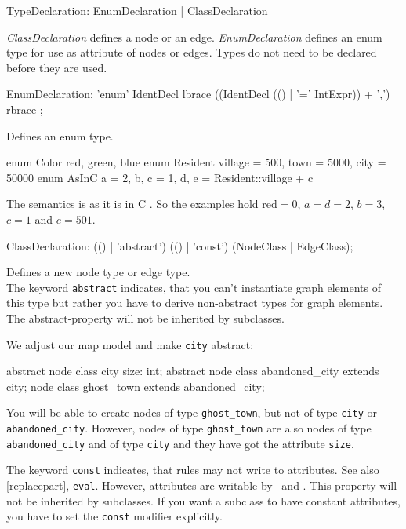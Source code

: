 \begin{rail}
  TypeDeclaration: EnumDeclaration | ClassDeclaration
\end{rail}
\emph{ClassDeclaration} defines a node or an edge. \emph{EnumDeclaration} defines an enum type for use as attribute of nodes or edges. Types do not need to be declared before they are used.

\begin{rail}
  EnumDeclaration: 'enum' IdentDecl lbrace ((IdentDecl (() | '=' IntExpr)) + ',') rbrace ;
\end{rail}
Defines an enum type.

\begin{example}
\begin{grgen}
enum Color {red, green, blue}
enum Resident {village = 500, town = 5000, city = 50000}
enum AsInC {a = 2, b, c = 1, d, e = Resident::village + c}
\end{grgen}
The semantics is as it is in C \cite{isoc}. So the examples hold $\text{red} = 0$, $a=d=2$, $b=3$, $c=1$ and $e=501$.
\end{example}

\begin{rail}  
  ClassDeclaration: (() | 'abstract') (() | 'const') (NodeClass | EdgeClass);
\end{rail}
Defines a new node type or edge type.\\
The keyword \texttt{abstract} indicates, that you can't instantiate graph elements of this type but rather you have to derive non-abstract types for graph elements. The abstract-property will not be inherited by subclasses.

\begin{example}
We adjust our map model and make \texttt{city} abstract:
\begin{grgen}
abstract node class city {
	size: int;
}
abstract node class abandoned_city extends city;
node class ghost_town extends abandoned_city;
\end{grgen}
You will be able to create nodes of type \texttt{ghost\_town}, but not of type \texttt{city} or \texttt{abandoned\_city}. However, nodes of type \texttt{ghost\_town} are also nodes of type \texttt{abandoned\_city} and of type \texttt{city} and they have got the attribute \texttt{size}.
\end{example}

The keyword \texttt{const} indicates, that rules may not write to attributes. See also \ref{replacepart}, \texttt{eval}. However, attributes are writable by \LibGr\ and \GrShell. This property will not be inherited by subclasses. If you want a subclass to have constant attributes, you have to set the \texttt{const} modifier explicitly.

